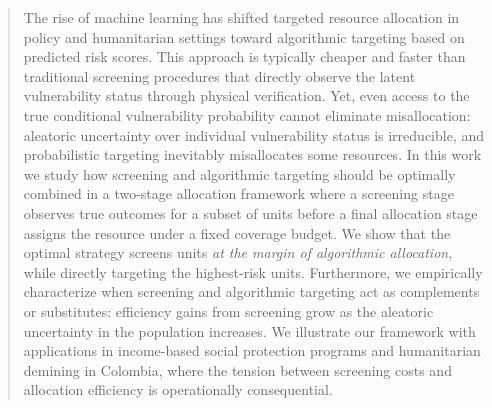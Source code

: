 \begin{abstract}
    The rise of machine learning has shifted targeted resource allocation in policy and humanitarian settings toward algorithmic targeting based on predicted risk scores. This approach is typically cheaper and faster than traditional screening procedures that directly observe the latent vulnerability status through physical verification. Yet, even access to the true conditional vulnerability probability cannot eliminate misallocation: aleatoric uncertainty over individual vulnerability status is irreducible, and probabilistic targeting inevitably misallocates some resources. In this work we study how screening and algorithmic targeting should be optimally combined in a two-stage allocation framework where a screening stage observes true outcomes for a subset of units before a final allocation stage assigns the resource under a fixed coverage budget. We show that the optimal strategy screens units \textit{at the margin of algorithmic allocation}, while directly targeting the highest-risk units. Furthermore, we empirically characterize when screening and algorithmic targeting act as complements or substitutes: efficiency gains from screening grow as the aleatoric uncertainty in the population increases. We illustrate our framework with applications in income-based social protection programs and humanitarian demining in Colombia, where the tension between screening costs and allocation efficiency is operationally consequential.
\end{abstract}

